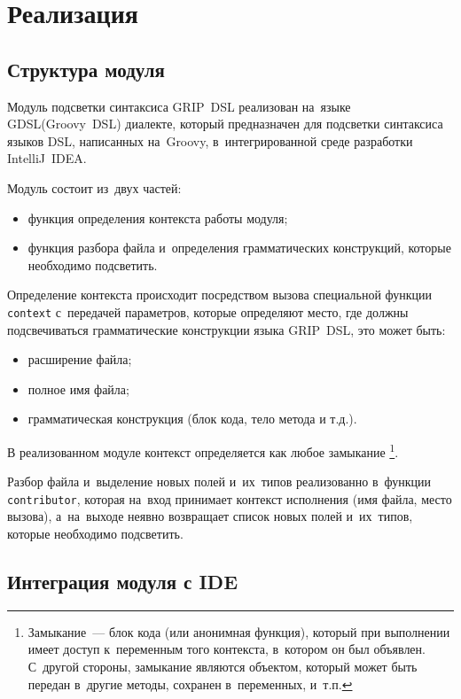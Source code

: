 \section{Реализация} \label{sub24}

\subsection{Структура модуля} \label{sub241}

Модуль подсветки синтаксиса GRIP~DSL реализован на~языке GDSL(Groovy~DSL) диалекте, который предназначен для подсветки синтаксиса языков DSL, написанных на~Groovy, в~интегрированной среде разработки IntelliJ~IDEA.

Модуль состоит из~двух частей:

\begin{itemize}
	\item{функция определения контекста работы модуля;}
	\item{функция разбора файла и~определения грамматических конструкций, которые необходимо подсветить.}
\end{itemize} 

Определение контекста происходит посредством вызова специальной функции \texttt{context} с~передачей параметров, которые определяют место, где должны подсвечиваться грамматические конструкции языка GRIP~DSL, это может быть:
\begin{itemize}
	\item{расширение файла;}
	\item{полное имя файла;}
	\item{грамматическая конструкция (блок кода, тело метода и т.д.).}
\end{itemize} 

В реализованном модуле контекст определяется как любое замыкание \footnote{Замыкание~--- блок кода (или анонимная функция), который при выполнении имеет доступ к~переменным того контекста, в~котором он был объявлен. С~другой стороны, замыкание являются объектом, который может быть передан в~другие методы, сохранен в~переменных, и~т.п.}.

Разбор файла и~выделение новых полей и~их~типов реализованно в~функции \texttt{contributor}, которая на~вход принимает контекст исполнения (имя файла, место вызова), а~на~выходе неявно возвращает список новых полей и~их~типов, которые необходимо подсветить.

\newpage

\subsection{Интеграция модуля с IDE} \label{sub242}

